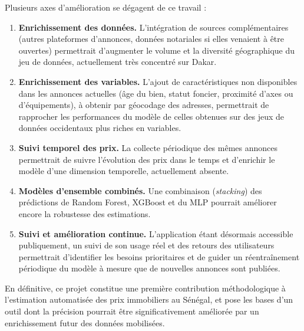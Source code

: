 Plusieurs axes d'amélioration se dégagent de ce travail :

\begin{enumerate}
  \item \textbf{Enrichissement des données.} L'intégration de sources complémentaires (autres
  plateformes d'annonces, données notariales si elles venaient à être ouvertes) permettrait
  d'augmenter le volume et la diversité géographique du jeu de données, actuellement très
  concentré sur Dakar.
  \item \textbf{Enrichissement des variables.} L'ajout de caractéristiques non disponibles dans
  les annonces actuelles (âge du bien, statut foncier, proximité d'axes ou d'équipements),
  à obtenir par géocodage des adresses, permettrait de rapprocher les
  performances du modèle de celles obtenues sur des jeux de données occidentaux plus riches en
  variables.
  \item \textbf{Suivi temporel des prix.} La collecte périodique des mêmes annonces
  permettrait de suivre l'évolution des prix dans le temps et d'enrichir le modèle d'une
  dimension temporelle, actuellement absente.
  \item \textbf{Modèles d'ensemble combinés.} Une combinaison (\emph{stacking}) des prédictions
  de Random Forest, XGBoost et du MLP pourrait améliorer encore la robustesse des estimations.
  \item \textbf{Suivi et amélioration continue.} L'application étant désormais accessible
  publiquement, un suivi de son usage réel et des retours des utilisateurs permettrait
  d'identifier les besoins prioritaires et de guider un réentraînement périodique du modèle à
  mesure que de nouvelles annonces sont publiées.
\end{enumerate}

En définitive, ce projet constitue une première contribution méthodologique à l'estimation
automatisée des prix immobiliers au Sénégal, et pose les bases d'un outil dont la précision
pourrait être significativement améliorée par un enrichissement futur des données mobilisées.
